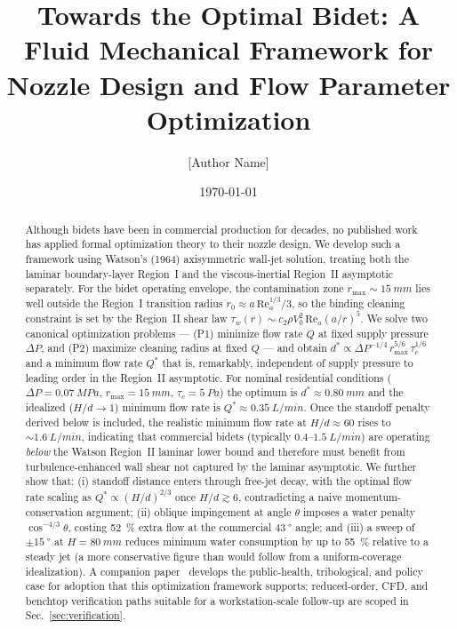 \documentclass[aps,prfluids,reprint,amsmath,amssymb,floatfix]{revtex4-2}
\newcommand{\Rey}{\mathrm{Re}}
\begin{document}
\title{Towards the Optimal Bidet: A Fluid Mechanical Framework
  for Nozzle Design and Flow Parameter Optimization}

\author{[Author Name]}

\date{\today}

\begin{abstract}
Although bidets have been in commercial production for decades, no published
work has applied formal optimization theory to their nozzle design. We
develop such a framework using Watson's (1964) axisymmetric wall-jet solution,
treating both the laminar boundary-layer Region~I and the viscous-inertial
Region~II asymptotic separately. For the bidet operating envelope, the
contamination zone $r_\mathrm{max} \sim \SI{15}{mm}$ lies well outside
the Region~I transition radius $r_0 \approx a\,\Rey_a^{1/3}/3$, so the
binding cleaning constraint is set by the Region~II shear law
$\tau_w(r) \sim c_2 \rho V_0^2\,\Rey_a (a/r)^5$. We solve two canonical
optimization problems --- (P1) minimize flow rate $Q$ at fixed supply
pressure $\Delta P$, and (P2) maximize cleaning radius at fixed $Q$ ---
and obtain $d^* \propto \Delta P^{-1/4}\,r_\mathrm{max}^{5/6}\,\tau_c^{1/6}$
and a minimum flow rate $Q^*$ that is, remarkably, independent of supply
pressure to leading order in the Region~II asymptotic. For nominal
residential conditions ($\Delta P = \SI{0.07}{MPa}$, $r_\mathrm{max} = \SI{15}{mm}$,
$\tau_c = \SI{5}{Pa}$) the optimum is
$d^* \approx \SI{0.80}{mm}$ and the idealized
($H/d \to 1$) minimum flow rate is $Q^* \approx \SI{0.35}{L/min}$. Once
the standoff penalty derived below is included, the realistic minimum
flow rate at $H/d \approx 60$ rises to $\sim \SI{1.6}{L/min}$, indicating
that commercial bidets (typically $0.4$--$\SI{1.5}{L/min}$) are operating
\emph{below} the Watson Region~II laminar lower bound and therefore must
benefit from turbulence-enhanced wall shear not captured by the laminar
asymptotic. We further show that: (i) standoff
distance enters through free-jet decay, with the optimal flow rate
scaling as $Q^* \propto (H/d)^{2/3}$ once $H/d \gtrsim 6$, contradicting
a naive momentum-conservation argument; (ii) oblique impingement at
angle $\theta$ imposes a water penalty $\cos^{-4/3}\theta$, costing
\SI{52}{\percent} extra flow at the commercial $\SI{43}{\degree}$ angle;
and (iii) a sweep of $\pm\SI{15}{\degree}$ at $H = \SI{80}{mm}$
reduces minimum water consumption by up to \SI{55}{\percent} relative
to a steady jet (a more conservative figure than would follow from a
uniform-coverage idealization). A companion paper~\citep{BurtonCasePaper}
develops the public-health, tribological, and policy case for adoption
that this optimization framework supports; reduced-order, CFD, and
benchtop verification paths suitable for a workstation-scale
follow-up are scoped in Sec.~\ref{sec:verification}.
\end{abstract}
\end{document}
